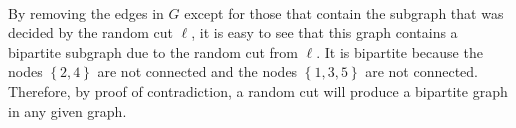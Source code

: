 \message{ !name(1-recurrence.tex)}\documentclass[addpoints]{exam}
\begin{document}
\begin{questions}
\begin{parts}
\begin{solution}
\\By removing the edges in $G$ except for those that contain the subgraph that was decided by the random cut $\ell$, it is easy to see that this graph contains a bipartite subgraph due to the random cut from $\ell$. It is bipartite because the nodes $\left\{ 2,4\right\}$ are not connected and the nodes $\left\{ 1,3,5\right\}$ are not connected. Therefore, by proof of contradiction, a random cut will produce a bipartite graph in any given graph.
\end{solution}
  \end{parts}
\end{questions}
\end{document}

